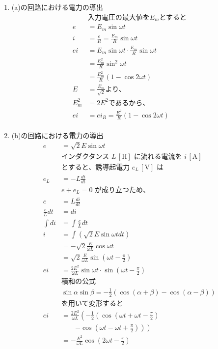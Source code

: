 \documentclass[twocolumn]{article}
\begin{document}
\begin{enumerate}
  \item (a)の回路における電力の導出
    \begin{align*}
    &\text{入力電圧の最大値を} E_m \text{とすると}\\
    e     &= E_m \sin \omega t \\ 
    i     &= \frac{e}{R} = \frac{E_m}{R} \sin \omega t \\ 
    ei    &= E_m \sin \omega t \cdot \frac{E_m}{R} \sin \omega t \\ 
          &= \frac{E_m^2}{R} \sin^2 \omega t \\ 
          &= \frac{E_m^2}{R} \left( 1 - \cos 2 \omega t \right) \\ 
    E     &= \frac{E_m}{\sqrt{2}} \text{より、} \\ 
    E_m^2 &= 2E^2 \text{であるから、} \\ 
    ei    &= ei_R = \frac{E^2}{R} \left( 1 - \cos 2 \omega t \right) \\
    \end{align*}

  \item (b)の回路における電力の導出
    \begin{align*}
    e &= \sqrt{2}E \sin \omega t \\ 
    &\text{インダクタンス } L\,[\text{H}] \text{ に流れる電流を } i\,[\text{A}] \\
    &\text{とすると、誘導起電力 } e_L\,[\text{V}] \text{ は} \\
    e_L &= -L \frac{di}{dt} \\
    &e + e_L = 0 \text{ が成り立つため、} \\
    e &= L \frac{di}{dt} \\ 
    \frac{e}{L} dt &= di \\ 
    \int di &= \int \frac{e}{L} dt \\ 
    i &= \int \left(\sqrt{2} E \sin \omega t dt\right) \\ 
      &= - \sqrt{2} \frac{E}{\omega L} \cos \omega t \\ 
      &= \sqrt{2}\frac{E}{\omega L}\sin \left(\omega t - \frac{\pi}{2}\right) \\ 
    ei  &= \frac{2E^2}{\omega L}\sin \omega t \cdot \sin \left(\omega t - \frac{\pi}{2}\right) \\
    &\text{積和の公式} \\
    &\sin\alpha \sin \beta = -\frac{1}{2} \left( \cos \left(\alpha + \beta\right) - \cos \left(\alpha - \beta\right) \right)\\
    &\text{を用いて変形すると}\\
    ei  &= \frac{2E^2}{\omega L} \left(- \frac{1}{2} \left(\cos\left(\omega t + \omega t - \frac{\pi}{2}\right) \right. \right. \\
        &  \qquad\left.\left. - \cos\left(\omega t - \omega t + \frac{\pi}{2}\right) 
        \right) \right)\\
        &= -\frac{E^2}{\omega L} \cos \left(2\omega t - \frac{\pi}{2}\right) 
    \end{align*}


\end{enumerate}
\end{document}

